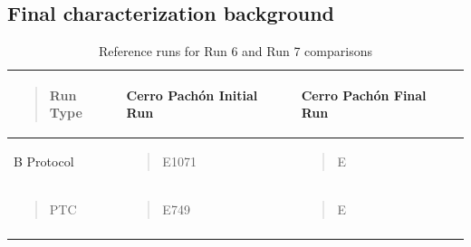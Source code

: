 \subsection{Final characterization background}\label{final_background}

\begin{longtable}[H]{@{}
  >{\raggedright\arraybackslash}p{}
  >{\raggedright\arraybackslash}p{}
  >{\raggedright\arraybackslash}p{}@{}}
\toprule\noalign{}
\label{runTable}
\begin{minipage}[b]{\linewidth}\raggedright
\begin{quote}
Run Type
\end{quote}
\end{minipage} & \begin{minipage}[b]{\linewidth}\raggedright
Cerro Pachón Initial Run
\end{minipage} & \begin{minipage}[b]{\linewidth}\raggedright
Cerro Pachón Final Run
\end{minipage} \\
\midrule\noalign{}
\endhead
\bottomrule\noalign{}
\endlastfoot
B Protocol & \begin{minipage}[t]{\linewidth}\raggedright
\begin{quote}
E1071
\end{quote}
\end{minipage} & \begin{minipage}[t]{\linewidth}\raggedright
\begin{quote}
E
\end{quote}
\end{minipage} \\
\begin{minipage}[t]{\linewidth}\raggedright
\begin{quote}
PTC
\end{quote}
\end{minipage} & \begin{minipage}[t]{\linewidth}\raggedright
\begin{quote}
E749
\end{quote}
\end{minipage} & \begin{minipage}[t]{\linewidth}\raggedright
\begin{quote}
E
\end{quote}
\end{minipage} \\
\caption{Reference runs for Run 6 and Run 7 comparisons}
\end{longtable}

